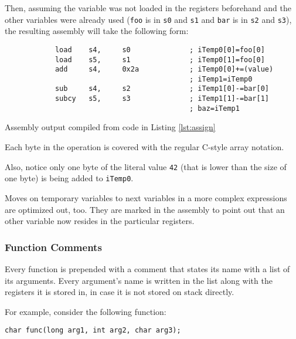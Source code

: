             Then, assuming the variable was not loaded in the registers beforehand and the other variables were already used (\texttt{foo} is in \texttt{s0} and \texttt{s1} and \texttt{bar} is in \texttt{s2} and \texttt{s3}), the resulting assembly will take the following form:

            \begin{listing}
            \centering
            \begin{verbatim}
            load    s4,     s0              ; iTemp0[0]=foo[0]
            load    s5,     s1              ; iTemp0[1]=foo[0]
            add     s4,     0x2a            ; iTemp0[0]+=(value)
                                            ; iTemp1=iTemp0
            sub     s4,     s2              ; iTemp1[0]-=bar[0]
            subcy   s5,     s3              ; iTemp1[1]-=bar[1]
                                            ; baz=iTemp1
            \end{verbatim}
            \caption{Assembly output compiled from code in Listing \ref{lst:assign}}\label{lst:assignasm}
            \end{listing}

            Each byte in the operation is covered with the regular C-style array notation.

            Also, notice only one byte of the literal value \texttt{42} (that is lower than the size of one byte) is being added to \texttt{iTemp0}. 

            Moves on temporary variables to next variables in a more complex expressions are optimized out, too. They are marked in the assembly to point out that an other variable now resides in the particular registers.

            \subsubsection{Function Comments}

            Every function is prepended with a comment that states its name with a list of its arguments. Every argument's name is written in the list along with the registers it is stored in, in case it is not stored on stack directly.

            For example, consider the following function:

            \begin{center}\texttt{char func(long arg1, int arg2, char arg3);}\end{center}

